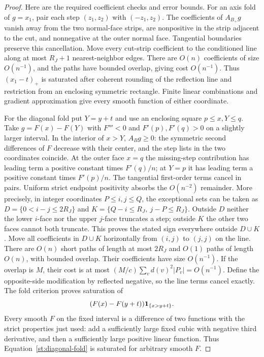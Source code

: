 \begin{proof}
Here are the required coefficient checks and error bounds. For an axis
fold of $g=x_1$, pair each step $(z_1,z_2)$ with $(-z_1,z_2)$.
The coefficients of $A_{B_+}g$ vanish away from the two normal-face strips,
are nonpositive in the strip adjacent to the cut, and nonnegative at the
outer normal face. Tangential boundaries preserve this cancellation.
Move every cut-strip coefficient to the conditioned line along at most
$R_J+1$ nearest-neighbor edges. There are $O(n)$ coefficients of size
$O(n^{-1})$, and the paths have bounded overlap, giving cost $O(n^{-1})$.
Thus $(x_1-t)_+$ is saturated after coherent rounding of the reflection
line and restriction from an enclosing symmetric rectangle. Finite linear
combinations and gradient approximation give every smooth function of
either coordinate.

For the diagonal fold put $Y=y+t$ and use an enclosing square
$p\le x,Y\le q$. Take $g=F(x)-F(Y)$ with $F'''<0$ and
$F'(p),F'(q)>0$ on a slightly larger interval. In the interior of $x>Y$,
$A_Bg\ge0$: the symmetric second differences of $F$ decrease with their
center, and the step lists in the two coordinates coincide. At the outer
face $x=q$ the missing-step contribution has leading term a positive
constant times $F'(q)/n$; at $Y=p$ it has leading term a positive constant
times $F'(p)/n$. The tangential first-order terms cancel in pairs.
Uniform strict endpoint positivity absorbs the $O(n^{-2})$ remainder.
More precisely, in integer coordinates $P\le i,j\le Q$, the exceptional
sets can be taken as $D=\{0<i-j\le2R_J\}$ and
$K=\{Q-i\le R_J,\ j-P\le R_J\}$. Outside $D$ neither the lower $i$-face
nor the upper $j$-face truncates a step; outside $K$ the other two faces
cannot both truncate. This proves the stated sign everywhere outside
$D\cup K$. Move all coefficients in $D\cup K$ horizontally from $(i,j)$
to $(j,j)$ on the line. There are $O(n)$ short paths of length at most
$2R_J$ and $O(1)$ paths of length $O(n)$, with bounded overlap.
Their coefficients have size $O(n^{-1})$. If the overlap is $M$, their
cost is at most $(M/c)\sum_v d(v)^2|P_v|=O(n^{-1})$.
Define the opposite-side modification by reflected negative, so the
line terms cancel exactly. The fold criterion proves
saturation of
\begin{equation}\label{st:diagonal-fold}
 (F(x)-F(y+t))\mathbf 1_{\{x>y+t\}}.
\end{equation}
Every smooth $F$ on the fixed interval is a difference of two functions
with the strict properties just used: add a sufficiently large fixed
cubic with negative third derivative, and then a sufficiently large
positive linear function. Thus Equation~\eqref{st:diagonal-fold} is
saturated for arbitrary smooth $F$.


\end{proof}

